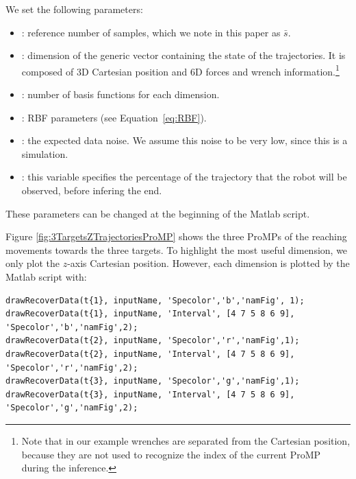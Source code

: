 \documentclass[utf8]{frontiersSCNS} %
\newcommand{\rev}[1]{\textcolor{blue}{#1}}
\newcommand{\todo}[1]{\textcolor{red}{\textbf{/*#1*/}}}
\begin{document}
We set the following parameters:
\begin{itemize}
\item {}: reference number of samples, which we note in this paper as $\bar{s}$.
\item {}: dimension of the generic vector containing the state of the trajectories. It is composed of 3D Cartesian position and 6D forces and wrench information.\footnote{Note that in our example wrenches are separated from the Cartesian position, because they are not used to recognize the index of the current ProMP during the inference.}
\item {}: number of basis functions for each  dimension.
\item {}: RBF parameters (see Equation~\ref{eq:RBF}).
\item {}: the expected data noise. We assume this noise to be very low, since this is a simulation.
\item {}: this variable specifies the percentage of the trajectory that the robot will be observed, before infering the end.
\end{itemize}
These parameters can be changed at the beginning of the Matlab script.


Figure \ref{fig:3TargetsZTrajectoriesProMP} shows the three ProMPs of the reaching movements towards the three targets. To highlight the most useful dimension, we only plot the $z$-axis Cartesian position. However, each dimension is plotted by the Matlab script with:
\begin{lstlisting}
drawRecoverData(t{1}, inputName, 'Specolor','b','namFig', 1);
drawRecoverData(t{1}, inputName, 'Interval', [4 7 5 8 6 9], 'Specolor','b','namFig',2);
drawRecoverData(t{2}, inputName, 'Specolor','r','namFig',1);
drawRecoverData(t{2}, inputName, 'Interval', [4 7 5 8 6 9], 'Specolor','r','namFig',2);
drawRecoverData(t{3}, inputName, 'Specolor','g','namFig',1);
drawRecoverData(t{3}, inputName, 'Interval', [4 7 5 8 6 9], 'Specolor','g','namFig',2);
\end{lstlisting}

\end{document}
